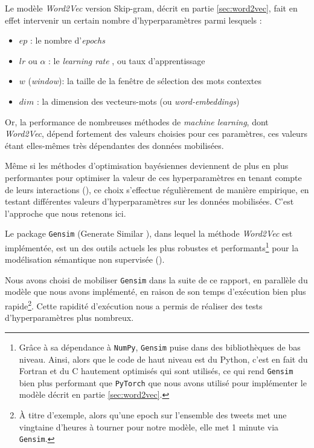 \documentclass[11pt,french,french]{article}
\let\rmarkdownfootnote\footnote%
\def\footnote{\protect\rmarkdownfootnote}
\begin{document}
Le modèle \emph{Word2Vec} version Skip-gram, décrit en partie \ref{sec:word2vec}, fait en effet intervenir un certain nombre d'hyperparamètres parmi lesquels :

\begin{itemize}
\item $ep$ : le nombre d'\og \emph{epochs} \fg{}
\item $lr$ ou $\alpha$ : le \og \emph{learning rate} \fg{}, ou taux d'apprentissage
\item $w$ (\emph{window}): la taille de la fenêtre de sélection des mots contextes
\item $dim$ : la dimension des vecteurs-mots (ou \emph{word-embeddings})
\end{itemize}

Or, la performance de nombreuses méthodes de \emph{machine learning}, dont \emph{Word2Vec}, dépend fortement des valeurs choisies pour ces paramètres, ces valeurs étant elles-mêmes très dépendantes des données mobilisées.

Même si les méthodes d'optimisation bayésiennes deviennent de plus en plus performantes pour optimiser la valeur de ces hyperparamètres en tenant compte de leurs interactions (\cite{Hutter}), ce choix s'effectue régulièrement de manière empirique, en testant différentes valeurs d'hyperparamètres sur les données mobilisées.
C'est l'approche que nous retenons ici.

Le package \texttt{Gensim} (\og Generate Similar \fg{}), dans lequel la méthode \emph{Word2Vec} est implémentée, est un des outils actuels les plus robustes et performants\footnote{Grâce à sa dépendance à \texttt{NumPy}, \texttt{Gensim} puise dans des bibliothèques de bas niveau.
  Ainsi, alors que le code de haut niveau est du Python, c'est en fait du Fortran et du C hautement optimisés qui sont utilisés, ce qui rend \texttt{Gensim} bien plus performant que \texttt{PyTorch} que nous avons utilisé pour implémenter le modèle décrit en partie \ref{sec:word2vec}.}
pour la modélisation sémantique non supervisée (\cite{Rehurek}).

Nous avons choisi de mobiliser \texttt{Gensim} dans la suite de ce rapport, en parallèle du modèle que nous avons implémenté, en raison de son temps d'exécution bien plus rapide\footnote{À titre d'exemple, alors qu'une epoch sur l'ensemble des tweets met une vingtaine d'heures à tourner pour \og notre \fg{} modèle, elle met 1 minute via \texttt{Gensim}.}. Cette rapidité d'exécution nous a permis de réaliser des tests d'hyperparamètres plus nombreux.
\end{document}
